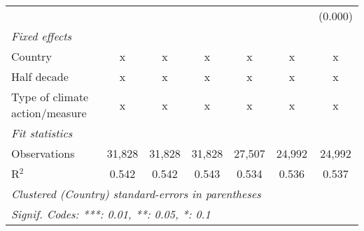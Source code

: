 \begin{tabular}{lcccccc}
                                                 &             &              &              &             &              & (0.000)\\   
   \emph{Fixed effects}\\
   Country                                       & x           & x            & x            & x           & x            & x\\  
   Half decade                                   & x           & x            & x            & x           & x            & x\\  
   Type of climate action/measure                & x           & x            & x            & x           & x            & x\\  
   \midrule \emph{Fit statistics}\\
   Observations                                  & 31,828      & 31,828       & 31,828       & 27,507      & 24,992       & 24,992\\  
   R$^2$                                         & 0.542       & 0.542        & 0.543        & 0.534       & 0.536        & 0.537\\  
   \midrule
   \multicolumn{7}{l}{\emph{Clustered (Country) standard-errors in parentheses}}\\
   \multicolumn{7}{l}{\emph{Signif. Codes: ***: 0.01, **: 0.05, *: 0.1}}\\
\end{tabular}
\par\endgroup


